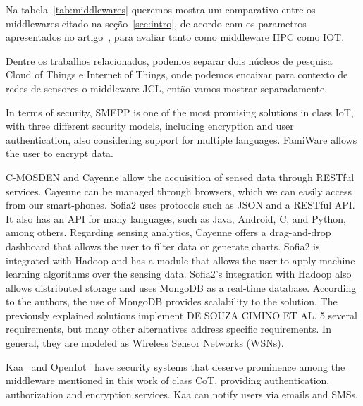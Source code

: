 \documentclass[12pt]{article}
\begin{document}
Na tabela~\ref{tab:middlewares} queremos mostra um comparativo entre os middlewares citado na seção~\ref{sec:intro}, de acordo com os parametros apresentados no artigo~\cite{Cimino2017}, para avaliar tanto como middleware HPC como IOT.

Dentre os trabalhos relacionados, podemos separar dois núcleos de pesquisa Cloud of Things e Internet of Things, onde podemos encaixar para contexto de redes de sensores o middleware JCL, então vamos mostrar separadamente.


In terms of security, SMEPP\cite{caro2009smepp} is one of the most promising solutions in class IoT, with three different security models, including encryption and user authentication, also considering support for multiple languages. FamiWare allows the user to encrypt data.

C-MOSDEN\cite{c-mosden} and Cayenne allow the acquisition of sensed data through RESTful services. Cayenne can be managed through browsers, which we can easily access from our smart-phones. 
Sofia2 uses protocols such as JSON and a RESTful API. It also has an API for many languages,
such as Java, Android, C, and Python, among others. Regarding sensing analytics, Cayenne offers a drag-and-drop
dashboard that allows the user to filter data or generate charts. Sofia2 is integrated with Hadoop and has a module that
allows the user to apply machine learning algorithms over the sensing data. Sofia2's integration with Hadoop also allows distributed storage and uses MongoDB as a real-time database. According
to the authors, the use of MongoDB provides scalability to the solution. The previously explained solutions implement
DE SOUZA CIMINO ET AL. 5
several requirements, but many other alternatives address specific requirements. In general, they are modeled as Wireless
Sensor Networks (WSNs).\cite{Cimino2018}

Kaa~\cite{Kaa} and OpenIot~\cite{openiot} have security systems that deserve prominence among the middleware mentioned in this work of class CoT, providing authentication, authorization and encryption services. Kaa can notify users via emails and SMSs.
\end{document}
